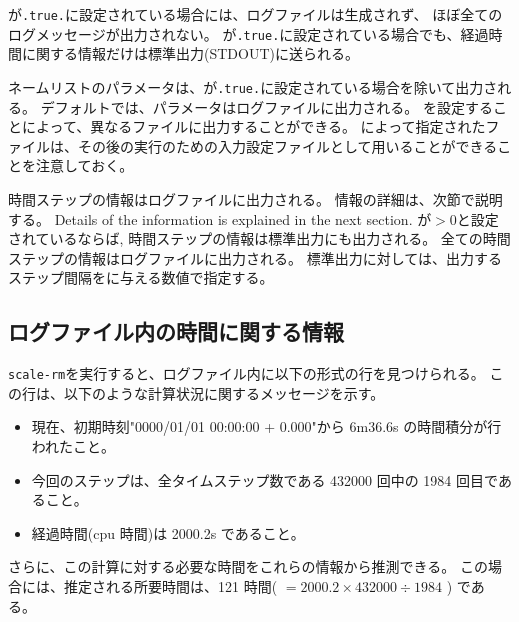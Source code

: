 が\verb|.true.|に設定されている場合には、ログファイルは生成されず、
ほぼ全てのログメッセージが出力されない。
が\verb|.true.|に設定されている場合でも、経過時間に関する情報だけは標準出力(STDOUT)に送られる。

ネームリストのパラメータは、が\verb|.true.|に設定されている場合を除いて出力される。
デフォルトでは、パラメータはログファイルに出力される。
を設定することによって、異なるファイルに出力することができる。
によって指定されたファイルは、その後の実行のための入力設定ファイルとして用いることができることを注意しておく。

時間ステップの情報はログファイルに出力される。
情報の詳細は、次節で説明する。
Details of the information is explained in the next section.
が$>0$と設定されているならば, 時間ステップの情報は標準出力にも出力される。
全ての時間ステップの情報はログファイルに出力される。
標準出力に対しては、出力するステップ間隔をに与える数値で指定する。


\subsection{ログファイル内の時間に関する情報}

\verb|scale-rm|を実行すると、ログファイル内に以下の形式の行を見つけられる。
この行は、以下のような計算状況に関するメッセージを示す。
\begin{itemize}
 \item 現在、初期時刻"0000/01/01 00:00:00 + 0.000"から 6m36.6s の時間積分が行われたこと。
 \item 今回のステップは、全タイムステップ数である 432000 回中の 1984 回目であること。
 \item 経過時間(cpu 時間)は 2000.2s であること。
\end{itemize}
さらに、この計算に対する必要な時間をこれらの情報から推測できる。
この場合には、推定される所要時間は、121 時間( $= 2000.2 \times 432000 \div 1984$ ) である。

